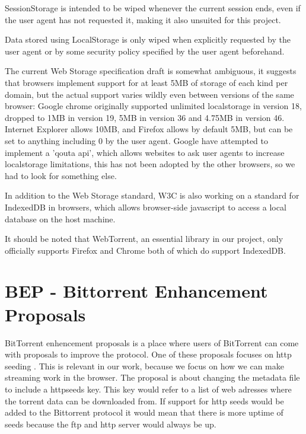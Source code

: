 SessionStorage is intended to be wiped whenever the current session ends, 
even if the user agent has not requested it, making it also unsuited for this project.

Data stored using LocalStorage is only wiped when explicitly requested by the user agent or 
by some security policy specified by the user agent beforehand.
\newline

The current Web Storage specification draft is somewhat ambiguous, 
it suggests that browsers implement support for at least 5MB of storage of each kind per domain,
but the actual support varies wildly even between versions of the same browser:
Google chrome originally supported unlimited localstorage in version 18, dropped to 1MB in version 19, 
5MB in version 36 and 4.75MB in version 46. 
Internet Explorer allows 10MB, 
and Firefox allows by default 5MB, but can be set to anything including 0 by the user agent.
Google have attempted to implement a 'qouta api', 
which allows websites to ask user agents to increase localstorage limitations, 
this has not been adopted by the other browsers, so we had to look for something else.
\newline

In addition to the Web Storage standard, W3C is also working on a standard for IndexedDB in browsers, 
which allows browser-side javascript to access a local database on the host machine.

It should be noted that WebTorrent, 
an essential library in our project, 
only officially supports Firefox and Chrome 
both of which do support IndexedDB.
\newline

\section{BEP - Bittorrent Enhancement Proposals}
BitTorrent enhencement proposals is a place where users of BitTorrent can come with proposals to improve the protocol.
One of these proposals focuses on http seeding \citep{bittorrent:bep17}.
This is relevant in our work, because we focus on how we can make streaming work in the browser. The proposal is about changing the metadata file to include a httpseeds key. This key would refer to a list of web adresses where the torrent data can be downloaded from.
If support for http seeds would be added to the Bittorrent protocol it would mean that there is more uptime of seeds because the ftp and http server would always be up.

